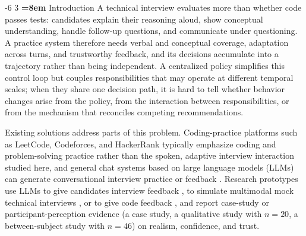 \documentclass[runningheads,a4paper]{llncs}
\makeatletter
\renewcommand\section{\@startsection{section}{1}{\z@}%
                       {-6\p@ \@plus -1\p@ \@minus -1\p@}%
                       {3\p@ \@plus 1\p@ \@minus 1\p@}%
                       {\normalfont\large\bfseries\boldmath
                        \rightskip=\z@ \@plus 8em\pretolerance=10000 }}
\makeatother
\begin{document}
\section{Introduction}
A technical interview evaluates more than whether code passes tests: candidates explain their reasoning aloud, show conceptual understanding, handle follow-up questions, and communicate under questioning. A practice system therefore needs verbal and conceptual coverage, adaptation across turns, and trustworthy feedback, and its decisions accumulate into a trajectory rather than being independent. A centralized policy simplifies this control loop but couples responsibilities that may operate at different temporal scales; when they share one decision path, it is hard to tell whether behavior changes arise from the policy, from the interaction between responsibilities, or from the mechanism that reconciles competing recommendations.

Existing solutions address parts of this problem. Coding-practice platforms such as LeetCode, Codeforces, and HackerRank typically emphasize coding and problem-solving practice rather than the spoken, adaptive interview interaction studied here, and general chat systems based on large language models (LLMs) can generate conversational interview practice or feedback \cite{vaishampayan2025}. Research prototypes use LLMs to give candidates interview feedback \cite{yazdani2025}, to simulate multimodal mock technical interviews \cite{gomez2025}, or to give code feedback \cite{vaishampayan2025}, and report case-study or participant-perception evidence (a case study, a qualitative study with $n=20$, a between-subject study with $n=46$) on realism, confidence, and trust.
\end{document}
